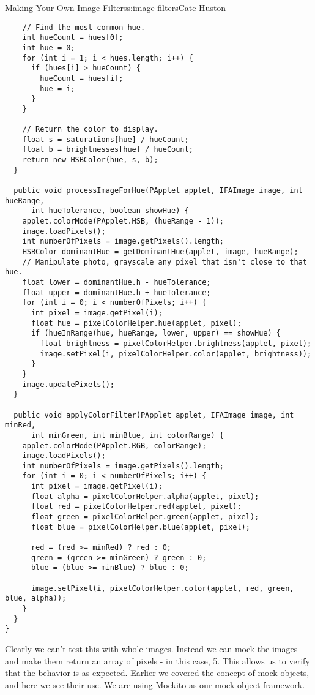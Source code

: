 \begin{aosachapter}{Making Your Own Image Filters}{s:image-filters}{Cate Huston}
\begin{verbatim}
    // Find the most common hue.
    int hueCount = hues[0];
    int hue = 0;
    for (int i = 1; i < hues.length; i++) {
      if (hues[i] > hueCount) {
        hueCount = hues[i];
        hue = i;
      }
    }

    // Return the color to display.
    float s = saturations[hue] / hueCount;
    float b = brightnesses[hue] / hueCount;
    return new HSBColor(hue, s, b);
  }

  public void processImageForHue(PApplet applet, IFAImage image, int hueRange,
      int hueTolerance, boolean showHue) {
    applet.colorMode(PApplet.HSB, (hueRange - 1));
    image.loadPixels();
    int numberOfPixels = image.getPixels().length;
    HSBColor dominantHue = getDominantHue(applet, image, hueRange);
    // Manipulate photo, grayscale any pixel that isn't close to that hue.
    float lower = dominantHue.h - hueTolerance;
    float upper = dominantHue.h + hueTolerance;
    for (int i = 0; i < numberOfPixels; i++) {
      int pixel = image.getPixel(i);
      float hue = pixelColorHelper.hue(applet, pixel);
      if (hueInRange(hue, hueRange, lower, upper) == showHue) {
        float brightness = pixelColorHelper.brightness(applet, pixel);
        image.setPixel(i, pixelColorHelper.color(applet, brightness));
      }
    }
    image.updatePixels();
  }

  public void applyColorFilter(PApplet applet, IFAImage image, int minRed,
      int minGreen, int minBlue, int colorRange) {
    applet.colorMode(PApplet.RGB, colorRange);
    image.loadPixels();
    int numberOfPixels = image.getPixels().length;
    for (int i = 0; i < numberOfPixels; i++) {
      int pixel = image.getPixel(i);
      float alpha = pixelColorHelper.alpha(applet, pixel);
      float red = pixelColorHelper.red(applet, pixel);
      float green = pixelColorHelper.green(applet, pixel);
      float blue = pixelColorHelper.blue(applet, pixel);

      red = (red >= minRed) ? red : 0;
      green = (green >= minGreen) ? green : 0;
      blue = (blue >= minBlue) ? blue : 0;

      image.setPixel(i, pixelColorHelper.color(applet, red, green, blue, alpha));
    }
  }
}
\end{verbatim}

Clearly we can't test this with whole images. Instead we can mock the
images and make them return an array of pixels - in this case, 5. This
allows us to verify that the behavior is as expected. Earlier we covered
the concept of mock objects, and here we see their use. We are using
\href{http://docs.mockito.googlecode.com/hg/org/mockito/Mockito.html}{Mockito}
as our mock object framework.


\end{aosachapter}
